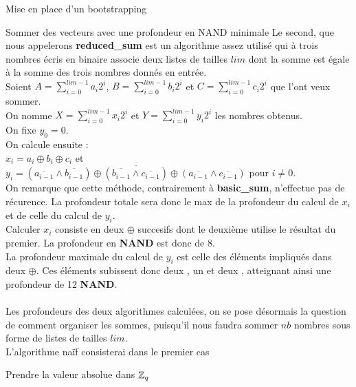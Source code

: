 \begin{section}{Mise en place d'un bootstrapping}
\begin{subsection}{Sommer des vecteurs avec une profondeur en NAND minimale}
Le second, que nous appelerons \textbf{reduced\_sum} est un algorithme assez utilisé qui à trois nombres écris en binaire associe deux listes de tailles $lim$ dont la somme est égale à la somme des trois nombres donnés en entrée. \\
Soient $A = \sum\limits_{i=0}^{lim-1} a_i 2^i$, $B = \sum\limits_{i=0}^{lim-1} b_i 2^i$ et $C = \sum\limits_{i=0}^{lim-1} c_i 2^i$ que l'ont veux sommer. \\
On nomme $X = \sum\limits_{i=0}^{lim-1} x_i 2^i$  et $Y = \sum\limits_{i=0}^{lim-1} y_i 2^i$ les nombres obtenus. \\
On fixe $y_0 = 0$. \\
On calcule ensuite : \\
$x_i = a_i \oplus b_i \oplus c_i$ et \\
$y_i = \overline{(\overline{a_{i-1}} \land \overline{b_{i-1}}) \oplus (\overline{b_{i-1}} \land \overline{c_{i-1}}) \oplus (\overline{a_{i-1}} \land \overline{c_{i-1}})}$ pour $i \neq 0$. \\
On remarque que cette méthode, contrairement à \textbf{basic\_sum}, n'effectue pas de récurence. La profondeur totale sera donc le max de la profondeur du calcul de $x_i$ et de celle du calcul de $y_i$. \\
Calculer $x_i$ consiste en deux $\oplus$ succesifs dont le deuxième utilise le résultat du premier. La profondeur en \textbf{NAND} est donc de 8. \\
La profondeur maximale du calcul de $y_i$ est celle des éléments impliqués dans deux $\oplus$. Ces éléments subissent donc deux , un  et deux , atteignant ainsi une profondeur de 12 \textbf{NAND}.

\paragraph{}

Les profondeurs des deux algorithmes calculées, on se pose désormais la question de comment organiser les sommes, puisqu'il nous faudra sommer $nb$ nombres sous forme de listes de tailles $lim$. \\
L'algorithme naïf consisterai dans le premier cas

\end{subsection}
\begin{subsection}{Prendre la valeur absolue dans $\mathbb{Z}_q$}
\end{subsection}
\end{section}
